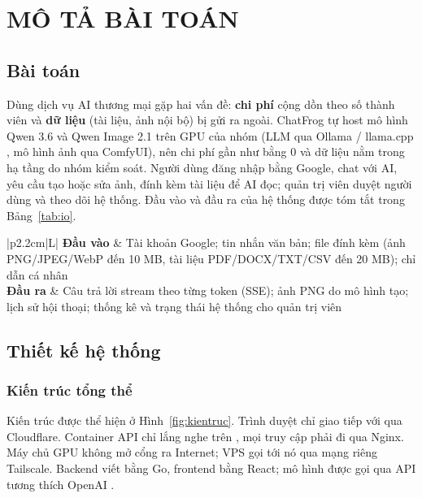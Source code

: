 \documentclass[
a4paper,
fontsize=13pt,
DIV=calc,
oneside,
numbers=enddot,
captions=tableheading,
bibliography=totoc,
]{scrreprt}
\newcommand{\tenLLM}{Qwen 3.6}
\newcommand{\tenImage}{Qwen Image 2.1}
\newcommand{\code}[1]{\texttt{\detokenize{#1}}}
\begin{document}
	{\tableofcontents}
	\clearpage
	
	\chapter{MÔ TẢ BÀI TOÁN}
	
	\section{Bài toán}
	
	Dùng dịch vụ AI thương mại gặp hai vấn đề: \textbf{chi phí} cộng dồn theo số thành viên và \textbf{dữ liệu} (tài liệu, ảnh nội bộ) bị gửi ra ngoài. ChatFrog tự host mô hình \tenLLM{} \cite{qwen3} và \tenImage{} trên GPU của nhóm (LLM qua Ollama / llama.cpp \cite{ollama}, mô hình ảnh qua ComfyUI), nên chi phí gần như bằng 0 và dữ liệu nằm trong hạ tầng do nhóm kiểm soát. Người dùng đăng nhập bằng Google, chat với AI, yêu cầu tạo hoặc sửa ảnh, đính kèm tài liệu để AI đọc; quản trị viên duyệt người dùng và theo dõi hệ thống. Đầu vào và đầu ra của hệ thống được tóm tắt trong Bảng~\ref{tab:io}.
	
	\begin{table}[H]
		\centering
		\caption{Đầu vào và đầu ra của hệ thống}\label{tab:io}
		\begin{tabularx}{\linewidth}{|p{2.2cm}|L|}
			\hline
			\textbf{Đầu vào} & Tài khoản Google; tin nhắn văn bản; file đính kèm (ảnh PNG/JPEG/WebP đến 10 MB, tài liệu PDF/DOCX/TXT/CSV đến 20 MB); chỉ dẫn cá nhân \\ \hline
			\textbf{Đầu ra} & Câu trả lời stream theo từng token (SSE); ảnh PNG do mô hình tạo; lịch sử hội thoại; thống kê và trạng thái hệ thống cho quản trị viên \\ \hline
		\end{tabularx}
	\end{table}
	
	\section{Thiết kế hệ thống}
	
	\subsection{Kiến trúc tổng thể}
	
	Kiến trúc được thể hiện ở Hình~\ref{fig:kientruc}. Trình duyệt chỉ giao tiếp với \code{chat.naot.me} qua Cloudflare. Container API chỉ lắng nghe trên \code{127.0.0.1}, mọi truy cập phải đi qua Nginx. Máy chủ GPU không mở cổng ra Internet; VPS gọi tới nó qua mạng riêng Tailscale. Backend viết bằng Go, frontend bằng React; mô hình được gọi qua API tương thích OpenAI \cite{openaiapi}.
	
\end{document}
